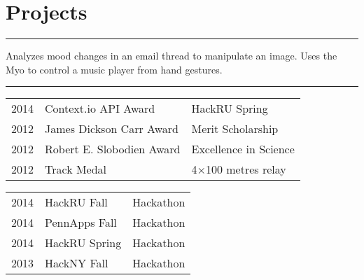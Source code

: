 \documentclass[letterpaper]{deedy-resume} %
\newcommand{\colorrule}[1]{%
\begingroup\color{#1}\hrule\endgroup%
}%
\begin{document}
\section{Projects}
\normalfont
\colorrule{black}
\vspace{2 mm}
\fontsize{10pt}{12pt}
Analyzes mood changes in an email thread to manipulate an image.
\hfill
{}
\hspace{2mm}
Uses the Myo to control a music player from hand gestures. 
\hfill
{}





\sectionspace

\hfill
{}
\vspace{1 mm}
\colorrule{black}
\normalfont
\vspace{2 mm}
\normalfont
\fontsize{10pt}{12pt}
\selectfont
\begin{minipage}[t]{0.66\textwidth}
\begin{tabular}{l|l|l}
2014 & Context.io API Award & HackRU Spring \\
2012 & James Dickson Carr Award& Merit Scholarship\\
2012 & Robert E. Slobodien Award& Excellence in Science\\   	
2012 & Track Medal & 4×100 metres relay\\

\end{tabular}
\end{minipage}
\begin{minipage}[t]{0.33\textwidth}
\hfill	
\begin{tabular}{l|l|l}
2014 & HackRU Fall & Hackathon\\
2014 & PennApps Fall & Hackathon\\ 
2014 & HackRU Spring & Hackathon\\
2013 & HackNY Fall   & Hackathon\\
\end{tabular}    
\end{minipage}
\end{document}
